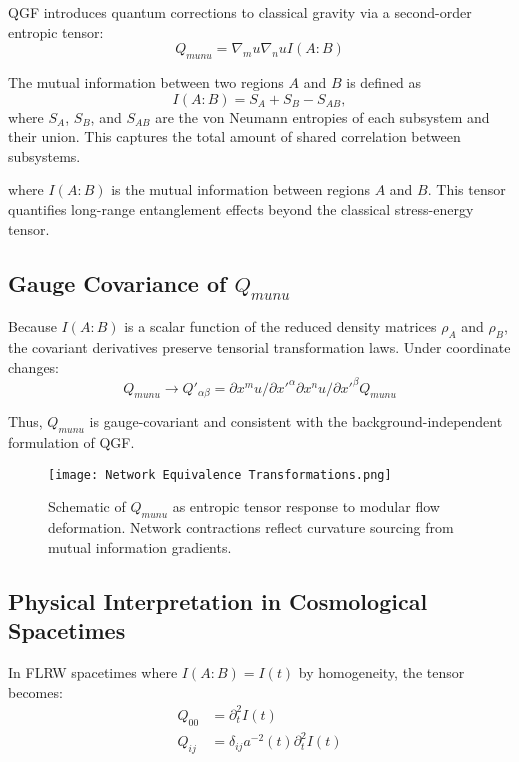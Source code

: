 \documentclass[11pt]{article}
\def\mu{mu}
\def\nu{nu}
\def\frac#1#2{#1/#2}
\begin{document}
QGF introduces quantum corrections to classical gravity via a second-order entropic tensor:
\begin{equation}
Q_{\mu\nu} = \nabla_\mu \nabla_\nu I(A:B)
\end{equation}

The mutual information between two regions \( A \) and \( B \) is defined as
\[
I(A : B) = S_A + S_B - S_{AB},
\]
where \( S_A \), \( S_B \), and \( S_{AB} \) are the von Neumann entropies of each subsystem and their union. This captures the total amount of shared correlation between subsystems.

where \( I(A:B) \) is the mutual information between regions \( A \) and \( B \). This tensor quantifies long-range entanglement effects beyond the classical stress-energy tensor.

\subsection{Gauge Covariance of \( Q_{\mu\nu} \)}

Because \( I(A:B) \) is a scalar function of the reduced density matrices \( \rho_A \) and \( \rho_B \), the covariant derivatives preserve tensorial transformation laws. Under coordinate changes:
\begin{equation}
Q_{\mu\nu} \rightarrow Q'_{\alpha\beta} = \frac{\partial x^\mu}{\partial x'^\alpha} \frac{\partial x^\nu}{\partial x'^\beta} Q_{\mu\nu}
\end{equation}

Thus, \( Q_{\mu\nu} \) is gauge-covariant and consistent with the background-independent formulation of QGF.

\begin{figure}[h!]
\centering
\texttt{[image: Network Equivalence Transformations.png]}
\caption{Schematic of \( Q_{\mu\nu} \) as entropic tensor response to modular flow deformation. Network contractions reflect curvature sourcing from mutual information gradients.}
\label{fig:q_tensor}
\end{figure}


\subsection{Physical Interpretation in Cosmological Spacetimes}

In FLRW spacetimes where \( I(A:B) = I(t) \) by homogeneity, the tensor becomes:
\begin{align}
Q_{00} &= \partial_t^2 I(t) \\
Q_{ij} &= \delta_{ij} a^{-2}(t) \partial_t^2 I(t)
\end{align}
\end{document}
